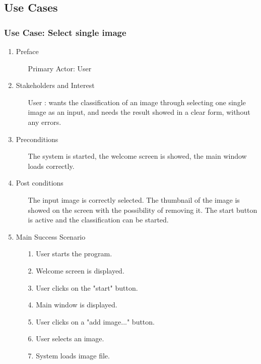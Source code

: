 \documentclass[parskip=full]{scrartcl}
\begin{document}
\subsection{Use Cases}


\subsubsection {Use Case: Select single image} \label {uc:sip}

\begin{enumerate}
	\item Preface
	\begin{itemize} [nosep]
		\item[] Primary Actor: User
	\end{itemize}
	\item Stakeholders and Interest
	\begin{itemize} [nosep]
		\item[] User : wants the classification of an image through selecting one single image as an input, and needs the result showed in a clear form, without any errors.
	\end{itemize}
	\item Preconditions
	\begin{itemize} [nosep]
		\item[] The system is started, the welcome screen is showed, the main window loads correctly.
	\end{itemize}
	\item Post conditions
	\begin{itemize} [nosep]
		\item[] The input image is correctly selected. The thumbnail of the image is showed on the screen with the possibility of removing it. The start button is active and the classification can be started.
	\end{itemize}
	\item Main Success Scenario
	\begin{itemize} [nosep]
		\item[1.] User starts the program.
		\item[2.] Welcome screen is displayed.
		\item[3.] User clicks on the "start" button.
		\item[4.] Main window is displayed.
		\item[5.] User clicks on a "add image..." button.
		\item[6.] User selects an image.
		\item[7.] System loads image file.

\end{itemize}
\end{enumerate}
\end{document}
